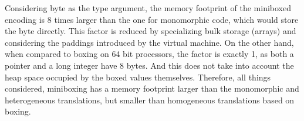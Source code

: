  Considering byte as the type argument, the memory footprint of the miniboxed encoding is 8 times larger than the one for monomorphic code, which would store the byte directly. This factor is reduced by specializing bulk storage (arrays) and considering the paddings introduced by the virtual machine. On the other hand, when compared to boxing on 64 bit processors, the factor is exactly 1, as both a pointer and a long integer have 8 bytes. And this does not take into account the heap space occupied by the boxed values themselves. Therefore, all things considered, miniboxing has a memory footprint larger than the monomorphic and heterogeneous translations, but smaller than homogeneous translations based on boxing.

